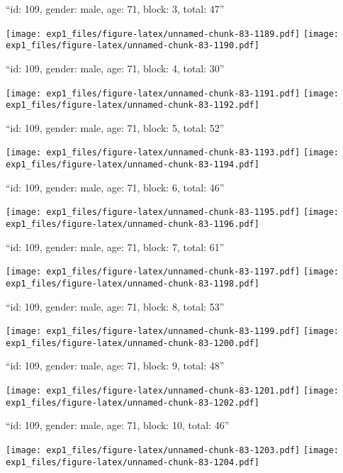 \documentclass[11pt,,]{article}
\begin{document}
\newpage
[1] 

``id: 109, gender: male, age: 71, block: 3, total: 47''

\texttt{[image: exp1\_files/figure-latex/unnamed-chunk-83-1189.pdf]}
\texttt{[image: exp1\_files/figure-latex/unnamed-chunk-83-1190.pdf]}

\newpage
[1] 

``id: 109, gender: male, age: 71, block: 4, total: 30''

\texttt{[image: exp1\_files/figure-latex/unnamed-chunk-83-1191.pdf]}
\texttt{[image: exp1\_files/figure-latex/unnamed-chunk-83-1192.pdf]}

\newpage
[1] 

``id: 109, gender: male, age: 71, block: 5, total: 52''

\texttt{[image: exp1\_files/figure-latex/unnamed-chunk-83-1193.pdf]}
\texttt{[image: exp1\_files/figure-latex/unnamed-chunk-83-1194.pdf]}

\newpage
[1] 

``id: 109, gender: male, age: 71, block: 6, total: 46''

\texttt{[image: exp1\_files/figure-latex/unnamed-chunk-83-1195.pdf]}
\texttt{[image: exp1\_files/figure-latex/unnamed-chunk-83-1196.pdf]}

\newpage
[1] 

``id: 109, gender: male, age: 71, block: 7, total: 61''

\texttt{[image: exp1\_files/figure-latex/unnamed-chunk-83-1197.pdf]}
\texttt{[image: exp1\_files/figure-latex/unnamed-chunk-83-1198.pdf]}

\newpage
[1] 

``id: 109, gender: male, age: 71, block: 8, total: 53''

\texttt{[image: exp1\_files/figure-latex/unnamed-chunk-83-1199.pdf]}
\texttt{[image: exp1\_files/figure-latex/unnamed-chunk-83-1200.pdf]}

\newpage
[1] 

``id: 109, gender: male, age: 71, block: 9, total: 48''

\texttt{[image: exp1\_files/figure-latex/unnamed-chunk-83-1201.pdf]}
\texttt{[image: exp1\_files/figure-latex/unnamed-chunk-83-1202.pdf]}

\newpage
[1] 

``id: 109, gender: male, age: 71, block: 10, total: 46''

\texttt{[image: exp1\_files/figure-latex/unnamed-chunk-83-1203.pdf]}
\texttt{[image: exp1\_files/figure-latex/unnamed-chunk-83-1204.pdf]}
\end{document}
